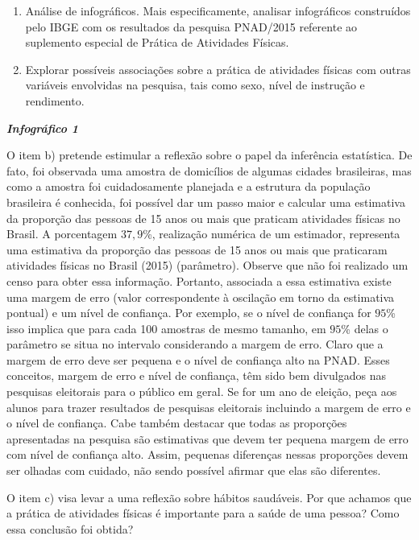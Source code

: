 \documentclass[10 pt,usenames,dvipsnames, oneside]{article}
\begin{document}
\begin{goals}
\begin{enumerate}
\item Análise de infográficos. Mais especificamente, analisar infográficos construídos pelo IBGE com os resultados da pesquisa PNAD/2015 referente ao suplemento especial de Prática de Atividades Físicas.

\item Explorar possíveis associações sobre a prática de atividades físicas com outras variáveis envolvidas na pesquisa, tais como sexo, nível de instrução e rendimento.
\end{enumerate}

\tcblower

\textit{\textbf{Infográfico 1}}

O item b) pretende estimular a reflexão sobre o papel da inferência estatística. De fato, foi observada uma amostra de domicílios de algumas cidades brasileiras, mas como a amostra foi cuidadosamente planejada e a estrutura da população brasileira é conhecida, foi possível dar um passo maior e calcular uma estimativa da proporção das pessoas de 15 anos ou mais que praticam atividades físicas no Brasil. A porcentagem $37{,}9$\%, realização numérica de um estimador, representa uma estimativa da proporção das pessoas de 15 anos ou mais que praticaram atividades físicas no Brasil (2015) (parâmetro). Observe que não foi realizado um censo para obter essa informação. Portanto, associada a essa estimativa existe uma margem de erro (valor correspondente à oscilação em torno da estimativa pontual) e um nível de confiança. Por exemplo, se o nível de confiança for $95$\% isso implica que para cada 100 amostras de mesmo tamanho, em $95$\% delas o parâmetro se situa no intervalo considerando a margem de erro. Claro que a margem de erro deve ser pequena e o nível de confiança alto na PNAD. Esses conceitos, margem de erro e nível de confiança, têm sido bem divulgados nas pesquisas eleitorais para o público em geral. Se for um ano de eleição, peça aos alunos para trazer resultados de pesquisas eleitorais incluindo a margem de erro e o nível de confiança. Cabe também destacar que todas as proporções apresentadas na pesquisa são estimativas que devem ter pequena margem de erro com nível de confiança alto. Assim, pequenas diferenças nessas proporções devem ser olhadas com cuidado, não sendo possível afirmar que elas são diferentes.

O item c) visa levar a uma reflexão sobre hábitos saudáveis. Por que achamos que a prática de atividades físicas é importante para a saúde de uma pessoa? Como essa conclusão foi obtida?


\end{goals}
\end{document}
